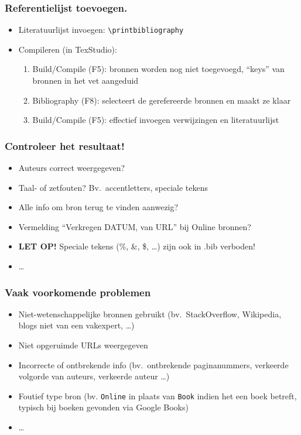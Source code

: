 \documentclass[aspectratio=169]{beamer}
\begin{document}
\begin{frame}[fragile]
  \frametitle{Referentielijst toevoegen.}

  \begin{itemize}
    \item Literatuurlijst invoegen: \verb|\printbibliography|

    \item Compileren (in TexStudio):

          \begin{enumerate}
            \item Build/Compile (F5): bronnen worden nog niet toegevoegd, ``keys'' van bronnen in het vet aangeduid
            \item Bibliography (F8): selecteert de gerefereerde bronnen en maakt ze klaar
            \item Build/Compile (F5): effectief invoegen verwijzingen en literatuurlijst
          \end{enumerate}
  \end{itemize}
\end{frame}

\begin{frame}
  \frametitle{Controleer het resultaat!}

  \begin{itemize}
    \item Auteurs correct weergegeven?
    \item Taal- of zetfouten? Bv.\ accentletters, speciale tekens
    \item Alle info om bron terug te vinden aanwezig?
    \item Vermelding ``Verkregen DATUM, van URL'' bij Online bronnen?
    \item \textbf{LET OP!} Speciale tekens (\%, \&, \$, \ldots) zijn ook in .bib verboden!
    \item \ldots
  \end{itemize}

\end{frame}

\begin{frame}
  \frametitle{Vaak voorkomende problemen}

  \begin{itemize}
    \item Niet-wetenschappelijke bronnen gebruikt (bv.\ StackOverflow, Wikipedia, blogs niet van een vakexpert, \ldots)
    \item Niet opgeruimde URLs weergegeven
    \item Incorrecte of ontbrekende info (bv.\ ontbrekende paginanummers, verkeerde volgorde van auteurs, verkeerde auteur \ldots)
    \item Foutief type bron (bv. \texttt{Online} in plaats van \texttt{Book} indien het een boek betreft, typisch bij boeken gevonden via Google Books)
    \item \ldots
  \end{itemize}
\end{frame}
\end{document}
